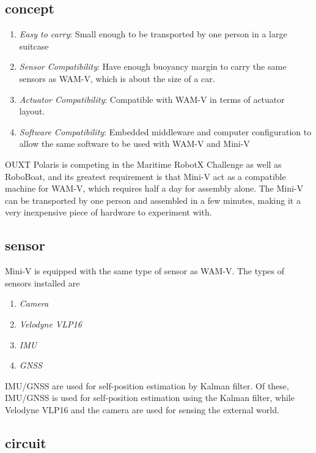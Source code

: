 \documentclass[lettersize,journal]{IEEEtran}
\begin{document}
\subsection{concept}

\begin{enumerate}
  \item {\it Easy to carry}: 
  Small enough to be transported by one person in a large suitcase
    
  \item {\it Sensor Compatibility}: 
  Have enough buoyancy margin to carry the same sensors as WAM-V, which is about the size of a car.

  \item {\it Actuator Compatibility}: 
  Compatible with WAM-V in terms of actuator layout.
  
  \item {\it Software Compatibility}: 
  Embedded middleware and computer configuration to allow the same software to be used with WAM-V and Mini-V
\end{enumerate}

OUXT Polaris is competing in the Maritime RobotX Challenge as well as RoboBoat, and its greatest requirement is that Mini-V act as a compatible machine for WAM-V, which requires half a day for assembly alone.
The Mini-V can be transported by one person and assembled in a few minutes, making it a very inexpensive piece of hardware to experiment with.

\subsection{sensor}

Mini-V is equipped with the same type of sensor as WAM-V.
The types of sensors installed are

\begin{enumerate}
  \item {\it Camera}
  \item {\it Velodyne VLP16}
  \item {\it IMU} 
  \item {\it GNSS}
\end{enumerate}

IMU/GNSS are used for self-position estimation by Kalman filter.
Of these, IMU/GNSS is used for self-position estimation using the Kalman filter, while Velodyne VLP16 and the camera are used for sensing the external world.

\subsection{circuit}
\end{document}
